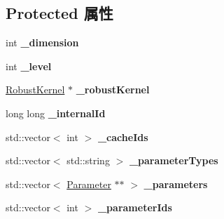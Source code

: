 \subsection*{Protected 属性}
\begin{DoxyCompactItemize}
\item 
\hypertarget{classg2o_1_1OptimizableGraph_1_1Edge_a4e651628f7657c81d0e4c1b26caaa6aa}{int {\bfseries \-\_\-dimension}}\label{classg2o_1_1OptimizableGraph_1_1Edge_a4e651628f7657c81d0e4c1b26caaa6aa}

\item 
\hypertarget{classg2o_1_1OptimizableGraph_1_1Edge_a57132078028dd0455aef141e62e07db9}{int {\bfseries \-\_\-level}}\label{classg2o_1_1OptimizableGraph_1_1Edge_a57132078028dd0455aef141e62e07db9}

\item 
\hypertarget{classg2o_1_1OptimizableGraph_1_1Edge_a6b942321f9e4e82051d529efb255af35}{\hyperlink{classg2o_1_1RobustKernel}{Robust\-Kernel} $\ast$ {\bfseries \-\_\-robust\-Kernel}}\label{classg2o_1_1OptimizableGraph_1_1Edge_a6b942321f9e4e82051d529efb255af35}

\item 
\hypertarget{classg2o_1_1OptimizableGraph_1_1Edge_abdfc449ed57479d90d2e57a8bc0bea12}{long long {\bfseries \-\_\-internal\-Id}}\label{classg2o_1_1OptimizableGraph_1_1Edge_abdfc449ed57479d90d2e57a8bc0bea12}

\item 
\hypertarget{classg2o_1_1OptimizableGraph_1_1Edge_a56bddaadd70570dbd96e8deed3d4b34c}{std\-::vector$<$ int $>$ {\bfseries \-\_\-cache\-Ids}}\label{classg2o_1_1OptimizableGraph_1_1Edge_a56bddaadd70570dbd96e8deed3d4b34c}

\item 
\hypertarget{classg2o_1_1OptimizableGraph_1_1Edge_a08666609850240956c64c95ae5ae0f2c}{std\-::vector$<$ std\-::string $>$ {\bfseries \-\_\-parameter\-Types}}\label{classg2o_1_1OptimizableGraph_1_1Edge_a08666609850240956c64c95ae5ae0f2c}

\item 
\hypertarget{classg2o_1_1OptimizableGraph_1_1Edge_a41c4d6a404d0b057d37fac43edec40ed}{std\-::vector$<$ \hyperlink{classg2o_1_1Parameter}{Parameter} $\ast$$\ast$ $>$ {\bfseries \-\_\-parameters}}\label{classg2o_1_1OptimizableGraph_1_1Edge_a41c4d6a404d0b057d37fac43edec40ed}

\item 
\hypertarget{classg2o_1_1OptimizableGraph_1_1Edge_a33a35663ba5b096cb6e6078014bd6f17}{std\-::vector$<$ int $>$ {\bfseries \-\_\-parameter\-Ids}}\label{classg2o_1_1OptimizableGraph_1_1Edge_a33a35663ba5b096cb6e6078014bd6f17}

\end{DoxyCompactItemize}

